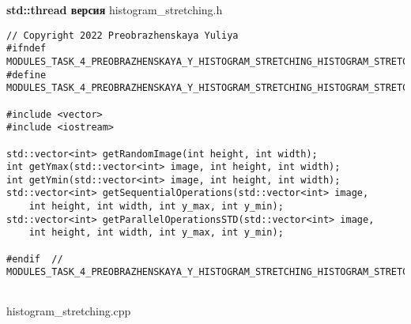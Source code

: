 \documentclass{report}
\begin{document}
\textbf{std::thread версия}
\newline
\newline histogram\_stretching.h
\begin{lstlisting}
// Copyright 2022 Preobrazhenskaya Yuliya
#ifndef MODULES_TASK_4_PREOBRAZHENSKAYA_Y_HISTOGRAM_STRETCHING_HISTOGRAM_STRETCHING_H_
#define MODULES_TASK_4_PREOBRAZHENSKAYA_Y_HISTOGRAM_STRETCHING_HISTOGRAM_STRETCHING_H_

#include <vector>
#include <iostream>

std::vector<int> getRandomImage(int height, int width);
int getYmax(std::vector<int> image, int height, int width);
int getYmin(std::vector<int> image, int height, int width);
std::vector<int> getSequentialOperations(std::vector<int> image,
    int height, int width, int y_max, int y_min);
std::vector<int> getParallelOperationsSTD(std::vector<int> image,
    int height, int width, int y_max, int y_min);

#endif  // MODULES_TASK_4_PREOBRAZHENSKAYA_Y_HISTOGRAM_STRETCHING_HISTOGRAM_STRETCHING_H_


\end{lstlisting}
histogram\_stretching.cpp
\end{document}
